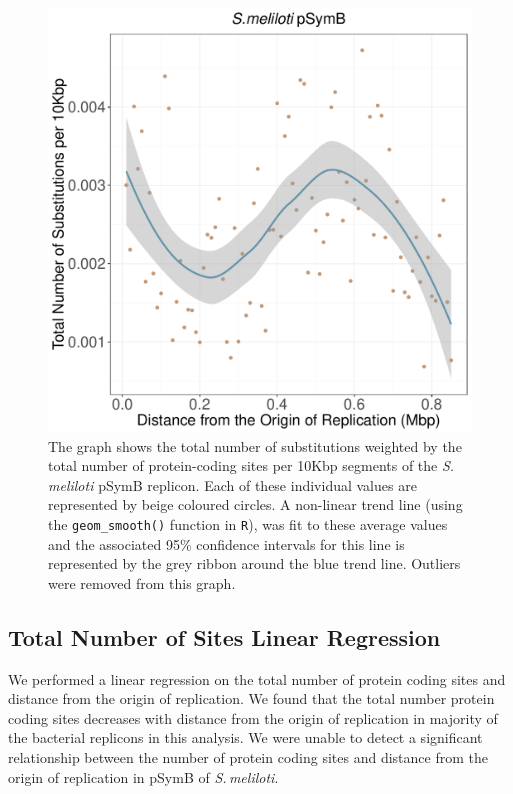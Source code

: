 \documentclass[11pt]{article}
\newcommand{\smel}{\textit{S.\,meliloti}\xspace}
\newcommand{\pb}{pSymB\xspace}
\begin{document}
\begin{figure}[h]
	\begin{center}
		\includegraphics[width=\textwidth]{./figs/pSymB_10KB_weighted_subs_nonpar_22Sep20.pdf}
		\caption{\label{fig:pSymB_nonpar}The graph shows the total number of substitutions weighted by the total number of protein-coding sites per 10Kbp segments of the \smel \pb replicon. Each of these individual values are represented by beige coloured circles. A non-linear trend line (using the \texttt{geom\_smooth()} function in \texttt{R}), was fit to these average values and the associated 95\% confidence intervals for this line is represented by the grey ribbon around the blue trend line. Outliers were removed from this graph.}
	\end{center}
\end{figure}

\subsection{Total Number of Sites Linear Regression}

We performed a linear regression on the total number of protein coding sites and distance from the origin of replication.
We found that the total number protein coding sites decreases with distance from the origin of replication in majority of the bacterial replicons in this analysis.
We were unable to detect a significant relationship between the number of protein coding sites and distance from the origin of replication in \pb of \smel.
\end{document}
